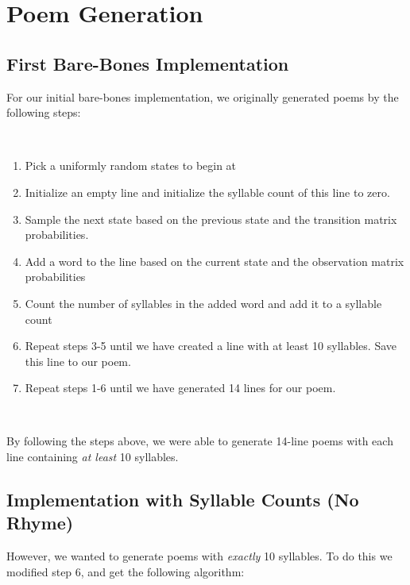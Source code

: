 \section*{Poem Generation}

\subsection*{First Bare-Bones Implementation}

For our initial bare-bones implementation, we originally generated poems by the following steps:

~

\begin{enumerate}

\item Pick a uniformly random states to begin at

\item Initialize an empty line and initialize the syllable count of this line to zero.

\item Sample the next state based on the previous state and the transition matrix probabilities.

\item Add a word to the line based on the current state and the observation matrix probabilities

\item Count the number of syllables in the added word and add it to a syllable count

\item Repeat steps 3-5 until we have created a line with at least 10 syllables. Save this line to our poem.

\item Repeat steps 1-6 until we have generated 14 lines for our poem.

\end{enumerate}
~

By following the steps above, we were able to generate 14-line poems with each line containing \textit{at least} 10 syllables. 

\subsection*{Implementation with Syllable Counts (No Rhyme)}

However, we wanted to generate poems with \textit{exactly} 10 syllables. To do this we modified step 6, and get the following algorithm:

